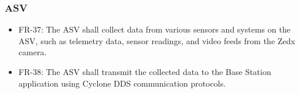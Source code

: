 \subsubsection{ASV}
\begin{itemize}
    \item FR-37: The ASV shall collect data from various sensors and systems on the ASV, such as telemetry data, sensor readings, and video feeds from the Zedx camera.
    \item FR-38: The ASV shall transmit the collected data to the Base Station application using Cyclone DDS communication protocols.
\end{itemize}

\newpage %